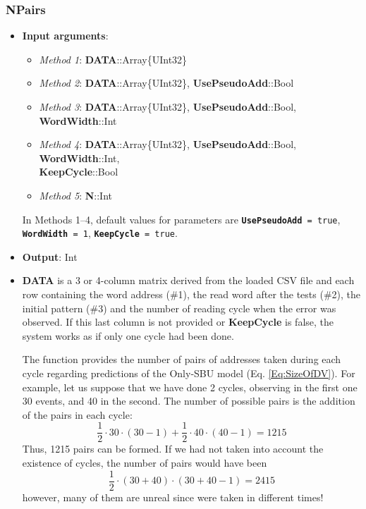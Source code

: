 \subsubsection*{NPairs}\label{Func:Npairs}
\begin{itemize}
	\item \textbf{Input arguments}:
	\begin{itemize}
		\item \textit{Method 1}: \textbf{DATA}::Array\{UInt32\}
		\item \textit{Method 2}: \textbf{DATA}::Array\{UInt32\}, \textbf{UsePseudoAdd}::Bool
		\item \textit{Method 3}: \textbf{DATA}::Array\{UInt32\}, \textbf{UsePseudoAdd}::Bool, \textbf{WordWidth}::Int
		\item \textit{Method 4}: \textbf{DATA}::Array\{UInt32\}, \textbf{UsePseudoAdd}::Bool, \textbf{WordWidth}::Int, \\ \textbf{KeepCycle}::Bool
		\item \textit{Method 5}: \textbf{N}::Int
	\end{itemize}

	In Methods 1--4, default values for parameters are \texttt{\textbf{UsePseudoAdd} = true}, \texttt{\textbf{WordWidth} = 1}, \texttt{\textbf{KeepCycle} = true}. 
	
	\item \textbf{Output}: Int 
	\item \textbf{DATA} is a 3 or 4-column matrix derived from the loaded CSV file and each row containing the word address (\#1), the read word after the tests (\#2), the initial pattern (\#3) and the number of reading cycle when the error was observed. If this last column is not provided or \textbf{KeepCycle} is false, the system works as if only one cycle had been done. 
	
	The function provides the number of pairs of addresses taken during each cycle regarding predictions of the Only-SBU model (Eq. \ref{Eq:SizeOfDV}). For example, let us suppose that we have done 2 cycles, observing in the first one 30 events, and 40 in the second. The number of possible pairs is the addition of the pairs in each cycle:
	\[
	\frac{1}{2}\cdot 30\cdot(30-1)+\frac{1}{2}\cdot 40\cdot(40-1) = 1215
	\]
	Thus, 1215 pairs can be formed. If we had not taken into account the existence of cycles, the number of pairs would have been\[	\frac{1}{2}\cdot (30+40)\cdot(30+40-1) = 2415\]
	however, many of them are unreal since were taken in different times!
	

\end{itemize}
